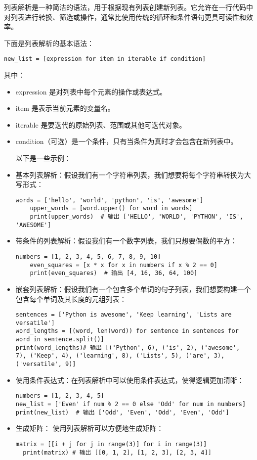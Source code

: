 \documentclass{article}
\begin{document}
列表解析是一种简洁的语法，用于根据现有列表创建新列表。它允许在一行代码中对列表进行转换、筛选或操作，通常比使用传统的循环和条件语句更具可读性和效率。

下面是列表解析的基本语法：
\begin{lstlisting}[caption={示例Python代码}]
new_list = [expression for item in iterable if condition]
\end{lstlisting}
其中：
\begin{itemize}
\item expression 是对列表中每个元素的操作或表达式。
\item item 是表示当前元素的变量名。
\item iterable 是要迭代的原始列表、范围或其他可迭代对象。
\item condition（可选）是一个条件，只有当条件为真时才会包含在新列表中。
\par 以下是一些示例：
\end{itemize}
\begin{itemize}
    \item 基本列表解析：假设我们有一个字符串列表，我们想要将每个字符串转换为大写形式：
    \begin{lstlisting}[caption={示例Python代码}]
    words = ['hello', 'world', 'python', 'is', 'awesome']
    upper_words = [word.upper() for word in words]
    print(upper_words)  # 输出 ['HELLO', 'WORLD', 'PYTHON', 'IS', 'AWESOME']
    \end{lstlisting}
    \item 带条件的列表解析：假设我们有一个数字列表，我们只想要偶数的平方：
    \begin{lstlisting}[caption={示例Python代码}]
    numbers = [1, 2, 3, 4, 5, 6, 7, 8, 9, 10]
    even_squares = [x * x for x in numbers if x % 2 == 0]
    print(even_squares)  # 输出 [4, 16, 36, 64, 100]
    \end{lstlisting}
    \item 嵌套列表解析：假设我们有一个包含多个单词的句子列表，我们想要构建一个包含每个单词及其长度的元组列表：
    \begin{lstlisting}[caption={示例Python代码}]
sentences = ['Python is awesome', 'Keep learning', 'Lists are versatile']
word_lengths = [(word, len(word)) for sentence in sentences for word in sentence.split()]
print(word_lengths)# 输出 [('Python', 6), ('is', 2), ('awesome', 7), ('Keep', 4), ('learning', 8), ('Lists', 5), ('are', 3), ('versatile', 9)]
    \end{lstlisting}
\item 使用条件表达式：在列表解析中可以使用条件表达式，使得逻辑更加清晰：
  \begin{lstlisting}[caption={示例Python代码}]
numbers = [1, 2, 3, 4, 5]
new_list = ['Even' if num % 2 == 0 else 'Odd' for num in numbers]
print(new_list)  # 输出 ['Odd', 'Even', 'Odd', 'Even', 'Odd']
\end{lstlisting}
  \item 生成矩阵：
  使用列表解析可以方便地生成矩阵：
  \begin{lstlisting}[caption={示例Python代码}]
  matrix = [[i + j for j in range(3)] for i in range(3)]
  print(matrix) # 输出 [[0, 1, 2], [1, 2, 3], [2, 3, 4]]
  \end{lstlisting}

\end{itemize}
\end{document}
